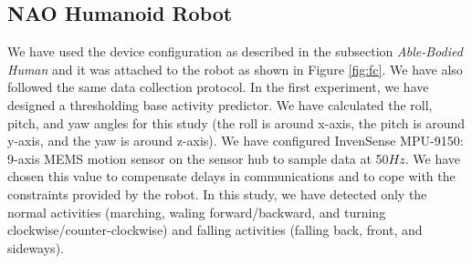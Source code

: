 \documentclass[letterpaper]{article}
\begin{document}
\subsection{NAO Humanoid Robot}


We have used the device configuration as described  in the subsection {\em Able-Bodied Human} 
and it was attached to the robot as shown in Figure \ref{fig:fc}. We have also followed the same 
data collection protocol. In the first experiment, we have designed a thresholding base activity 
predictor. We have calculated the roll, pitch, and yaw angles for this study (the roll is around 
x-axis, the pitch is around y-axis, and the yaw is around z-axis). We have configured InvenSense 
MPU-9150: 9-axis MEMS motion sensor on the sensor hub to sample data
at 50$Hz$. We have chosen this value to compensate delays in communications and to cope with the
constraints provided by the robot. In this study, we have detected only the normal 
activities (marching, waling forward/backward, and turning clockwise/counter-clockwise)
and falling activities (falling back, front, and sideways). 
\end{document}
